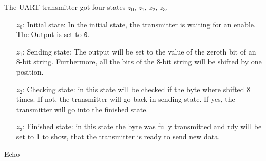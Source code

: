 The UART-transmitter got four states $z_0$, $z_1$, $z_2$, $z_3$.
\begin{itemize}


\item[$z_0$:] Initial state: In the initial state, the transmitter is waiting for an enable. The Output is set to \verb+0+.
\item[$z_1$:] Sending state: The output will be set to the value of the zeroth bit of an 8-bit string. Furthermore, all the bits of the 8-bit string will be shifted by one position.
\item[$z_2$:] Checking state: in this state will be checked if the byte where shifted 8 times. If not, the transmitter will go back in sending state. If yes, the transmitter will go into the finished state.
\item[$z_3$:] Finished state: in this state the byte was fully transmitted and rdy will be set to 1 to show, that the transmitter is ready to send new data.

\end{itemize}

Echo
